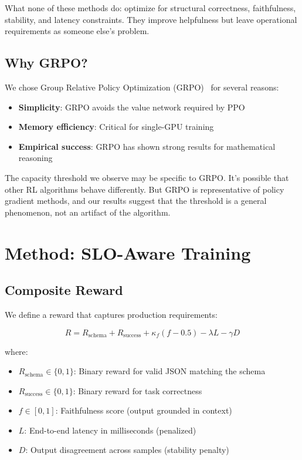 \documentclass[11pt]{article}
\begin{document}
What none of these methods do: optimize for structural correctness, faithfulness, stability, and latency constraints.
They improve helpfulness but leave operational requirements as someone else's problem.

\subsection{Why GRPO?}

We chose Group Relative Policy Optimization (GRPO)~\citep{grpo} for several reasons:
\begin{itemize}[leftmargin=12pt]
    \item \textbf{Simplicity}: GRPO avoids the value network required by PPO
    \item \textbf{Memory efficiency}: Critical for single-GPU training
    \item \textbf{Empirical success}: GRPO has shown strong results for mathematical reasoning
\end{itemize}

The capacity threshold we observe may be specific to GRPO.
It's possible that other RL algorithms behave differently.
But GRPO is representative of policy gradient methods, and our results suggest that the threshold is a general phenomenon, not an artifact of the algorithm.

\section{Method: SLO-Aware Training}
\label{sec:method}

\subsection{Composite Reward}

We define a reward that captures production requirements:

\begin{equation}
R = R_{\text{schema}} + R_{\text{success}} + \kappa_f (f - 0.5) - \lambda L - \gamma D
\end{equation}

where:
\begin{itemize}[leftmargin=12pt]
    \item $R_{\text{schema}} \in \{0, 1\}$: Binary reward for valid JSON matching the schema
    \item $R_{\text{success}} \in \{0, 1\}$: Binary reward for task correctness
    \item $f \in [0, 1]$: Faithfulness score (output grounded in context)
    \item $L$: End-to-end latency in milliseconds (penalized)
    \item $D$: Output disagreement across samples (stability penalty)
\end{itemize}
\end{document}
